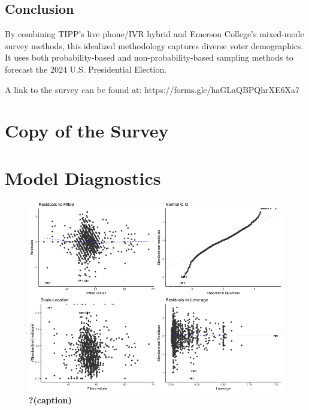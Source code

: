 \documentclass[
  letterpaper,
  DIV=11,
  numbers=noendperiod]{scrartcl}
\begin{document}
\hypertarget{conclusion-1}{%
\subsection{Conclusion}\label{conclusion-1}}

By combining TIPP's live phone/IVR hybrid and Emerson College's
mixed-mode survey methods, this idealized methodology captures diverse
voter demographics. It uses both probability-based and
non-probability-based sampling methods to forecast the 2024 U.S.
Presidential Election.

A link to the survey can be found at:
https://forms.gle/haGLaQBPQhrXE6Xa7

\hypertarget{copy-of-the-survey}{%
\section{Copy of the Survey}\label{copy-of-the-survey}}



\hypertarget{model-diagnostics}{%
\section{Model Diagnostics}\label{model-diagnostics}}

\begin{figure}

{\centering \includegraphics{../other/graphs/diagnostic_plot_model3.png}

}

\caption{\label{fig-dgplotone}\textbf{?(caption)}}

\end{figure}
\end{document}
